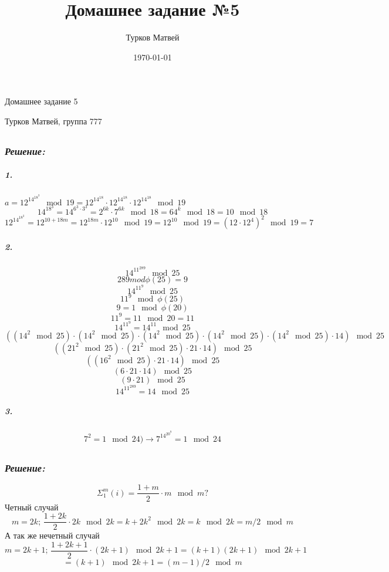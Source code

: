 \documentclass[a4paper, 11pt]{article} %
\author{Турков Матвей}
\title{Домашнее задание №5}
\date{\today}
\newcommand*\circled[1]{\tikz[baseline=(char.base)]{
            \node[shape=circle,draw,inner sep=2pt] (char) {#1};}}
\begin{document}
\begin{center}
  \begin{Large}
    Домашнее задание 5
    \end{Large}
\end{center}
\begin{center}
  \begin{Large}
    Турков Матвей, группа 777
  \end{Large}
\end{center}

	\hfill \break	

\subsection*{\circled{1}} 
\subsubsection*{\textit{Решение:}}
\subparagraph{1.}
$a = 12^{14^{18^3}} \mod 19 = 12^{14^{18}} \cdot 12^{14^{18}} \cdot 12^{14^{18}} \mod 19 $
\[14^{18^{3}} = 14^{6^{3}\cdot 3^{3}} = 2^{6k}\cdot7^{6k} \mod 18 = 64^k \mod 18 = 10\mod 18\]
\[12^{14^{18^{3}}} = 12^{10+18m} = 12^{18m}\cdot 12^{10} \mod 19 = 12^{10} \mod 19 = (12 \cdot 12^4)^2 \mod 19 = 7  \]

\subparagraph{2.}
\[14^{11^{289}} \mod 25\]
\[289 mod \phi(25) = 9\]
\[14^{11^{9}} \mod 25\]
\[11^9 \mod \phi(25) \]
\[9 = 1\mod \phi(20)\]
\[11^9 = 11 \mod 20 = 11\]
\[14^{11^{9}} = 14^{11} \mod 25\]
\[((14^2\mod 25)\cdot (14^2 \mod 25) \cdot (14^2 \mod 25) \cdot (14^2 \mod 25) \cdot (14^2 \mod 25) \cdot 14)\mod 25\]
\[((21^2\mod 25)\cdot(21^2\mod 25)\cdot 21 \cdot 14) \mod 25\]
\[((16^2\mod 25)\cdot 21 \cdot 14) \mod 25\]
\[(6\cdot 21 \cdot 14) \mod 25\]
\[(9\cdot 21 ) \mod 25\]
\[14^{11^{289}} = 14 \mod 25\]
\subparagraph{3.}
\[7^2 = 1 \mod 24) \rightarrow 7^{14^{20^9}} = 1 \mod 24 \]

\subsection*{\circled{3}} 
\subsubsection*{\textit{Решение:}}
\[\Sigma_{1}^{m}(i) = \frac{1 + m}{2} \cdot m \mod m?\]
Четный случай
\[m = 2k;\, \frac{1 + 2k}{2} \cdot 2k \mod 2k = k + 2k^2 \mod 2k = k  \mod 2k = m/2\mod m\]
А так же нечетный случай 
\[ m = 2k+1;\, \frac{1 + 2k + 1}{2} \cdot (2k+1) \mod 2k+1 = (k+1)(2k+1) \mod 2k +1 \]
\[= (k+1) \mod 2k+1 = (m-1)/2 \mod m\]
\end{document}
